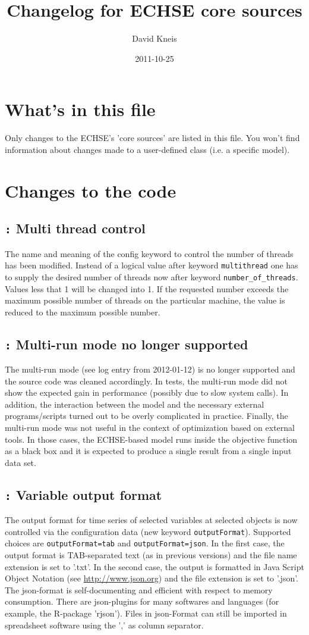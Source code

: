 \documentclass[a4paper,10pt]{article}
\author{David Kneis}
\date{2011-10-25}
\title{Changelog for ECHSE core sources}
\newcommand{\logentry}[2]{\subsection*{\texttt{\color{red}{#1}:} \large{\textbf{#2}}}}
\begin{document}
\section{What's in this file}
Only changes to the ECHSE's 'core sources' are listed in this file. You won't find information about changes made to a user-defined class (i.e. a specific model).


\section{Changes to the code}

\logentry{2014-05-07}{Multi thread control}
The name and meaning of the config keyword to control the number of threads has been modified.
Instead of a logical value after keyword \verb!multithread! one has to supply the desired number of threads now after keyword \verb!number_of_threads!. Values less that 1 will be changed into 1. If the requested number exceeds the maximum possible number of threads on the particular machine, the value is reduced to the maximum possible number.

\logentry{2014-02-27}{Multi-run mode no longer supported}
The multi-run mode (see log entry from 2012-01-12) is no longer supported and the source code was cleaned accordingly. In tests, the multi-run mode did not show the expected gain in performance (possibly due to slow system calls). In addition, the interaction between the model and the necessary external programs/scripts turned out to be overly complicated in practice. Finally, the multi-run mode was not useful in the context of optimization based on external tools. In those cases, the ECHSE-based model runs inside the objective function as a black box and it is expected to produce a single result from a single input data set.

\logentry{2014-02-27}{Variable output format}
The output format for time series of selected variables at selected objects is now controlled via the configuration data (new keyword \verb!outputFormat!). Supported choices are \verb!outputFormat=tab! and \verb!outputFormat=json!. In the first case, the output format is TAB-separated text (as in previous versions) and the file name extension is set to '.txt'. In the second case, the output is formatted in Java Script Object Notation (see \url{http://www.json.org}) and the file extension is set to '.json'. The json-format is self-documenting and efficient with respect to memory consumption. There are json-plugins for many softwares and languages (for example, the R-package 'rjson'). Files in json-Format can still be imported in spreadsheet software using the ',' as column separator.
\end{document}
